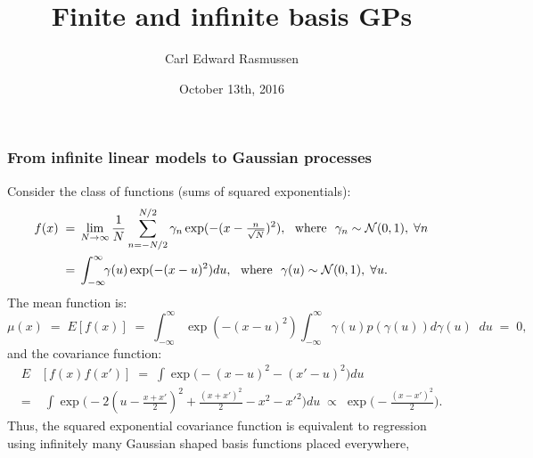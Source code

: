 

\title{Finite and infinite basis GPs}
\author{Carl Edward Rasmussen}
\date{October 13th, 2016}



\begin{frame}
\titlepage
\end{frame}

\begin{frame}
\frametitle{From infinite linear models to Gaussian processes}

Consider the class of functions (sums of squared exponentials):
\[
\begin{split}
f(x)\;=&\;\lim_{N\rightarrow\infty}\frac{1}{N}\sum_{n=-N/2}^{N/2}\gamma_n\exp(-(x-\tfrac{n}{\sqrt{N}})^2),
\text{\ \ where\ \ }\gamma_n\sim{\cal N}
(0, 1),\;\forall n\\
=&\;\int_{-\infty}^\infty\!\! \gamma(u)\exp(-(x-u)^2)du,
\text{\ \ where\ \ }\gamma(u)\sim{\cal N}(0,1),\;\forall u.
\end{split}
\]
The mean function is:
\[
\mu(x)\;=\;E[f(x)]\;=\;\int_{-\infty}^\infty\exp(-(x-u)^2)
\int_{-\infty}^\infty\!\!\gamma(u) p(\gamma(u))d\gamma(u) \; \; du\;=\;0,
\]
and the covariance function:
\[
\begin{split}
E&[f(x)f(x')]\;=\;\int\exp\big(\!-(x-u)^2-(x'-u)^2\big)du\\
=&\;\int\exp\big(\!-2(u-\frac{x+x'}{2})^2+\frac{(x+x')^2}{2}-x^2-x'^2\big)du
\;\propto\;\exp\big(\!-\frac{(x-x')^2}{2}\big).
\end{split}
\]
Thus, the squared exponential covariance function is equivalent to regression
using infinitely many Gaussian shaped basis functions placed everywhere,
\end{frame}


